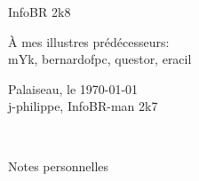 \thispagestyle{empty}

\begin{center}
\begin{Huge}
InfoBR 2k8
\end{Huge}
\end{center}


\begin{flushright}
\begin{large} 
 { \selectfont
\`A mes illustres prédécesseurs:\\
\smallskip
mYk, bernardofpc, questor, eracil \\ }
\end{large}
\vspace{1cm}
{Palaiseau, le \today \\
\medskip
 j-philippe, InfoBR-man 2k7  }
\end{flushright} 


\newpage

\thispagestyle{plain}


\hrulefill \, \begin{Large}Notes personnelles\end{Large} \hrulefill